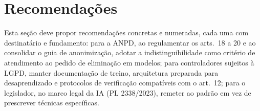 \section{Recomendações}


Esta seção deve propor recomendações concretas e numeradas, cada uma com
destinatário e fundamento: para a ANPD, ao regulamentar os arts.~18 a 20 e
ao consolidar o guia de anonimização, adotar a indistinguibilidade como
critério de atendimento ao pedido de eliminação em modelos; para
controladores sujeitos à LGPD, manter documentação de treino, arquitetura
preparada para desaprendizado e protocolos de verificação compatíveis com
o art.~12; para o legislador, no marco legal da IA (PL 2338/2023), remeter
ao padrão em vez de prescrever técnicas específicas.

